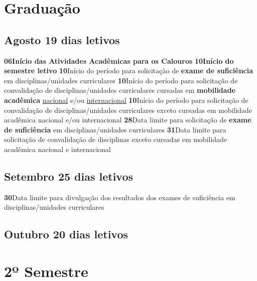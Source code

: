 \documentclass[thesis]{hmcposter}
\begin{document}
\begin{poster}
\section{\color{hmcorange}Graduação}\subsection{Agosto \hfill 19 dias letivos}\textbf{06}\qquad \textbf{Início das Atividades Acadêmicas para os Calouros} \newline \null\textbf{10}\qquad \textbf{Início do semestre letivo} \newline \null\textbf{10}\qquad Início do período para solicitação de \textbf{exame de suficiência} em disciplinas/unidades curriculares \newline \null\textbf{10}\qquad Início do período para solicitação de convalidação de disciplinas/unidades curriculares cursadas em \textbf{mobilidade acadêmica} \underline{nacional} e/ou \underline{internacional} \newline \null\textbf{10}\qquad Início do período para solicitação de convalidação de disciplinas/unidades curriculares exceto cursadas em mobilidade acadêmica nacional e/ou internacional \newline \null\textbf{28}\qquad Data limite para solicitação de \textbf{exame de suficiência} em disciplinas/unidades curriculares \newline \null\textbf{31}\qquad Data limite para solicitação de convalidação de disciplinas exceto cursadas em mobilidade acadêmica nacional e internacional \newline \null\subsection{Setembro \hfill 25 dias letivos}\textbf{30}\qquad Data limite para divulgação dos resultados dos exames de suficiência em disciplinas/unidades curriculares \newline \null\subsection{Outubro \hfill 20 dias letivos}\vfill\null
\columnbreak
\section{\hfill \color{hmcorange}2º Semestre}

\end{poster}
\end{document}
